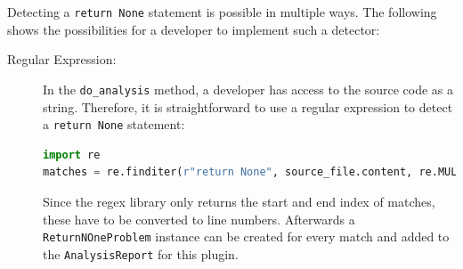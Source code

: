 Detecting a \texttt{return None} statement is possible in multiple ways. The following shows the possibilities for a developer to implement such a detector:
\begin{description}
    \item[Regular Expression:] In the \texttt{do\_analysis} method, a developer has access to the source code as a string. Therefore, it is straightforward to use a regular expression to detect a \texttt{return None} statement:
    \begin{lstlisting}[language=Python]
import re
matches = re.finditer(r"return None", source_file.content, re.MULTILINE | re.DOTALL) \end{lstlisting}
    Since the regex library only returns the start and end index of matches, these have to be converted to line numbers. Afterwards a \texttt{ReturnNOneProblem} instance can be created for every match and added to the \texttt{AnalysisReport} for this plugin.


\end{description}
